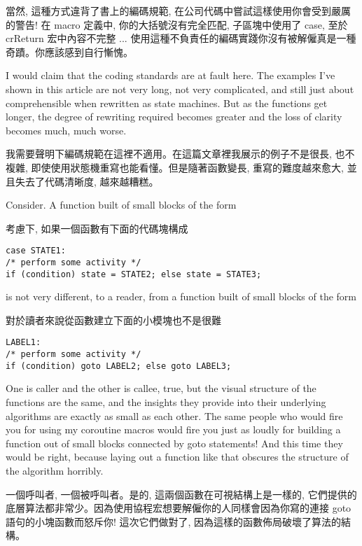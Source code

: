 \documentclass[12pt]{article}
\begin{document}
\begin{CJK}{UTF8}{bsmi}
當然, 這種方式違背了書上的編碼規範, 在公司代碼中嘗試這樣使用你會受到嚴厲的警告! 在 macro 定義中, 你的大括號沒有完全匹配, 子區塊中使用了 case, 至於 crReturn 宏中內容不完整 ... 使用這種不負責任的編碼實踐你沒有被解僱真是一種奇蹟。你應該感到自行慚愧。 

I would claim that the coding standards are at fault here. The examples I've shown in this article are not very long, not very complicated, and still just about comprehensible when rewritten as state machines. But as the functions get longer, the degree of rewriting required becomes greater and the loss of clarity becomes much, much worse.

我需要聲明下編碼規範在這裡不適用。在這篇文章裡我展示的例子不是很長, 也不複雜, 即使使用狀態機重寫也能看懂。但是隨著函數變長, 重寫的難度越來愈大, 並且失去了代碼清晰度, 越來越糟糕。 

Consider. A function built of small blocks of the form

考慮下, 如果一個函數有下面的代碼塊構成 

\begin{lstlisting}[basicstyle=\footnotesize, breaklines=true]
case STATE1:
/* perform some activity */
if (condition) state = STATE2; else state = STATE3;
\end{lstlisting}

is not very different, to a reader, from a function built of small blocks of the form

 對於讀者來說從函數建立下面的小模塊也不是很難 

\begin{lstlisting}[basicstyle=\footnotesize, breaklines=true]
LABEL1:
/* perform some activity */
if (condition) goto LABEL2; else goto LABEL3;
\end{lstlisting}

One is caller and the other is callee, true, but the visual structure of the functions are the same, and the insights they provide into their underlying algorithms are exactly as small as each other. The same people who would fire you for using my coroutine macros would fire you just as loudly for building a function out of small blocks connected by goto statements! And this time they would be right, because laying out a function like that obscures the structure of the algorithm horribly.

 一個呼叫者, 一個被呼叫者。是的, 這兩個函數在可視結構上是一樣的, 它們提供的底層算法都非常少。因為使用協程宏想要解僱你的人同樣會因為你寫的連接 goto 語句的小塊函數而怒斥你! 這次它們做對了, 因為這樣的函數佈局破壞了算法的結構。 


\end{CJK}
\end{document}
